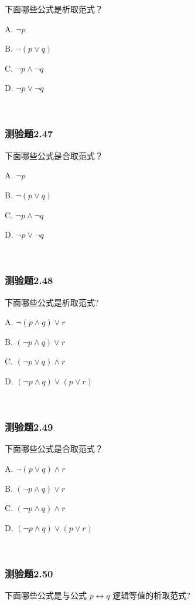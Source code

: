 \documentclass[UTF8, heading=true]{ctexart}
\begin{document}
下面哪些公式是析取范式？

A. $ \neg p$

B. $\neg(p \vee q)$

C. $\neg p \wedge \neg q$

D. $ \neg p \vee \neg q$

\textcolor{white}{答案：ACD}

\subsubsection{测验题2.47}

下面哪些公式是合取范式？

A. $ \neg p$

B. $\neg(p \vee q)$

C. $\neg p \wedge \neg q$

D. $ \neg p \vee \neg q$

\textcolor{white}{答案：ACD}

\subsubsection{测验题2.48}

下面哪些公式是析取范式?

A. $\neg(p \wedge q) \vee r$

B. $(\neg p \wedge q) \vee r$

C. $(\neg p \vee q) \wedge r$

D. $(\neg p \wedge q) \vee(p \vee r)$

\textcolor{white}{答案：BD}


\subsubsection{测验题2.49}

下面哪些公式是合取范式？

A. $ \neg(p \vee q) \wedge r$

B. $(\neg p \wedge q) \vee r$

C. $(\neg p \wedge q) \wedge r$

D. $(\neg p \wedge q) \vee(p \vee r)$

\textcolor{white}{答案：C}

\subsubsection{测验题2.50}

下面哪些公式是与公式 $p \leftrightarrow q$ 逻辑等值的析取范式?
\end{document}
